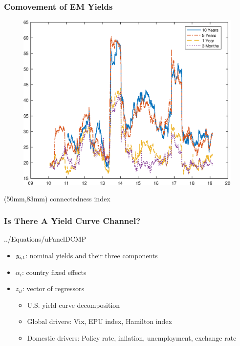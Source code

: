 \documentclass[12pt, aspectratio=169, xcolor=dvipsnames]{beamer}  %
\begin{document}
\begin{frame}
	\frametitle{Comovement of EM Yields}
	\begin{figure}[!htbp]
		\begin{center} %
			\includegraphics[trim={0cm 0cm 0cm 0cm},clip,height=0.7\textheight,width=0.85\linewidth]{../Figures/Estimation/dy_index_dn_data.eps}
			\par\end{center}
	\end{figure}
	\begin{textblock*}{70mm}(50mm,83mm)
		\tiny \cite{DieboldYilmaz:2014} connectedness index
	\end{textblock*}
\end{frame}

\begin{frame}
\frametitle{Is There A Yield Curve Channel?}
	\vspace{-1cm}
			 {../Equations/uPanelDCMP}
	\vspace{-1cm}
	\begin{itemize}
		\item \(y_{i,t}\): nominal yields and their three components
		\item \(\alpha_{i}\): country fixed effects
		\item \(z_{it}\): vector of regressors
		\begin{itemize}
			\item U.S. yield curve decomposition \citep{KimWright:2005}
			\item Global drivers: Vix, EPU index, Hamilton index
			\item Domestic drivers: Policy rate, inflation, unemployment, exchange rate %
		\end{itemize}
	\end{itemize}
\end{frame}
\end{document}
